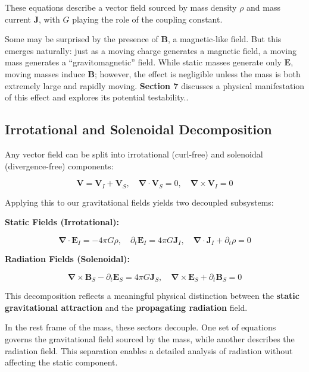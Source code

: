 \documentclass {article}
\renewcommand\vec{\mathbf}
\let\OldS\nabla
\renewcommand{\nabla}{\boldsymbol{\OldS}}
\begin{document}
These equations describe a vector field sourced by mass density \( \rho \) and mass current \( \vec{J} \), with \( G \) playing the role of the coupling constant. 

Some may be surprised by the presence of \( \vec{B} \), a magnetic-like field. But this emerges naturally: just as a moving charge generates a magnetic field, a moving mass generates a “gravitomagnetic” field. While static masses generate only \( \vec{E}\), moving masses induce \( \vec{B} \); however, the effect is negligible unless the mass is both extremely large and rapidly moving. \textbf{Section 7} discusses a physical manifestation of this effect and explores its potential testability..

\subsection{Irrotational and Solenoidal Decomposition}

Any vector field can be split into irrotational (curl-free) and solenoidal (divergence-free) components:

\begin{equation}
\vec{V} = \vec{V}_I + \vec{V}_S, \quad 
\nabla \cdot \vec{V}_S = 0, \quad 
\nabla \times \vec{V}_I = 0
\end{equation}

Applying this to our gravitational fields yields two decoupled subsystems:

\vspace{0.5em}
\noindent\textbf{Static Fields (Irrotational):}

\begin{equation}
\nabla \cdot \vec{E}_I = -4 \pi G \rho, \quad 
\partial_t \vec{E}_I = 4 \pi G \vec{J}_I, \quad 
\nabla \cdot \vec{J}_I + \partial_t \rho = 0
\end{equation}

\noindent\textbf{Radiation Fields (Solenoidal):}


\begin{equation}
\nabla \times \vec{B}_S - \partial_t \vec{E}_S = 4 \pi G \vec{J}_S, \quad 
\nabla \times \vec{E}_S + \partial_t \vec{B}_S = 0
\end{equation}

This decomposition reflects a meaningful physical distinction between the \textbf{static gravitational attraction} and the \textbf{propagating radiation} field.

In the rest frame of the mass, these sectors decouple. One set of equations governs the gravitational field sourced by the mass, while another describes the radiation field. This separation enables a detailed analysis of radiation without affecting the static component.
\end{document}
